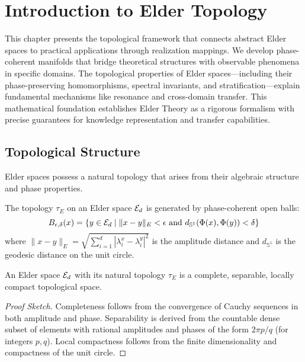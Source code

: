 \chapter{Introduction to Elder Topology}

\begin{chapterabstract}
This chapter presents the topological framework that connects abstract Elder spaces to practical applications through realization mappings. We develop phase-coherent manifolds that bridge theoretical structures with observable phenomena in specific domains. The topological properties of Elder spaces—including their phase-preserving homomorphisms, spectral invariants, and stratification—explain fundamental mechanisms like resonance and cross-domain transfer. This mathematical foundation establishes Elder Theory as a rigorous formalism with precise guarantees for knowledge representation and transfer capabilities.
\end{chapterabstract}

\section{Topological Structure}

Elder spaces possess a natural topology that arises from their algebraic structure and phase properties.

\begin{definition}
The topology $\tau_E$ on an Elder space $\mathcal{E}_{d}$ is generated by phase-coherent open balls:
\begin{equation}
B_{\epsilon,\delta}(x) = \{y \in \mathcal{E}_{d} \mid \|x - y\|_E < \epsilon \text{ and } d_{\mathbb{S}^1}(\Phi(x), \Phi(y)) < \delta\}
\end{equation}
where $\|x - y\|_E = \sqrt{\sum_{i=1}^{d}|\lambda_i^x - \lambda_i^y|^2}$ is the amplitude distance and $d_{\mathbb{S}^1}$ is the geodesic distance on the unit circle.
\end{definition}

\begin{theorem}
An Elder space $\mathcal{E}_{d}$ with its natural topology $\tau_E$ is a complete, separable, locally compact topological space.
\end{theorem}

\begin{proof}[Proof Sketch]
Completeness follows from the convergence of Cauchy sequences in both amplitude and phase. Separability is derived from the countable dense subset of elements with rational amplitudes and phases of the form $2\pi p/q$ (for integers $p,q$). Local compactness follows from the finite dimensionality and compactness of the unit circle.
\end{proof}

